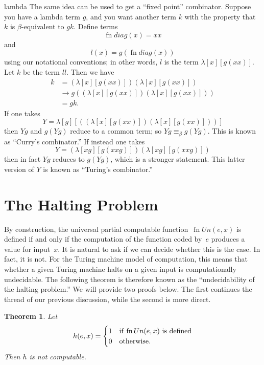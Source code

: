 \documentclass[10pt,a4paper]{article}
\theoremstyle{plain}
\newtheorem{thm}{Theorem}[section]
\theoremstyle{definition}
\theoremstyle{remark}
\newenvironment{digress}{}{}
\newcommand*{\olfileid}[3]{}
\newcommand*{\olsection}[1]{\section*{#1}}
\newcommand*{\ollabel}[1]{\label{#1}}
\providecommand{\lambd}{\ensuremath{\lambda}}
\providecommand{\red}{\mathrel{\rightarrow}}
\providecommand{\fn}{\operatorname{fn}}
\begin{document}
\begin{tagblock}{lambda}
\begin{digress}
The same idea can be used to get a ``fixed point'' combinator. Suppose
you have a lambda term $g$, and you want another term $k$ with the
property that $k$ is $\beta$-equivalent to $gk$. Define terms
\[
\fn{diag}(x) = xx
\]
and
\[
l(x) = g(\fn{diag}(x))
\]
using our notational conventions; in other words, $l$ is the term
$\lambd[x][g(xx)]$. Let $k$ be the term $ll$. Then we have
\begin{align*}
k & = (\lambd[x][g(xx)])(\lambd[x][g(xx)]) \\
& \red  g((\lambd[x][g(xx)])(\lambd[x][g(xx)])) \\
& = gk.
\end{align*}
If one takes
\[
Y = \lambd[g][((\lambd[x][g(xx)])(\lambd[x][g(xx)]))]
\]
then $Yg$ and $g(Yg)$ reduce to a common term; so $Yg \equiv_\beta
g(Yg)$. This is known as ``Curry's combinator.'' If instead one takes
\[
Y = (\lambd[xg][g(xxg)])(\lambd[xg][g(xxg)])
\]
then in fact $Yg$ reduces to $g(Yg)$, which is a stronger statement.
This latter version of $Y$ is known as ``Turing's combinator.''
\end{digress}
\end{tagblock}





\olfileid{cmp}{thy}{hlt}
\olsection{The Halting Problem}

By construction, the universal partial computable
function~$\fn{Un}(e,x)$ is defined if and only if the computation of
the function coded by~$e$ produces a value for input~$x$. It is
natural to ask if we can decide whether this is the case. In fact, it
is not. For the Turing machine model of computation, this means that
whether a given Turing machine halts on a given input is
computationally undecidable. The following theorem is therefore known
as the ``undecidability of the halting problem.'' We will provide two
proofs below. The first continues the thread of our previous
discussion, while the second is more direct.

\begin{thm}
\ollabel{thm:halting-problem}
Let
\[
h(e, x)  =
\begin{cases}
1 & \text{if\/ $\fn{Un}(e, x)$ is defined} \\
0 & \text{otherwise.}
\end{cases}
\]
Then $h$ is not computable.
\end{thm}
\end{document}
